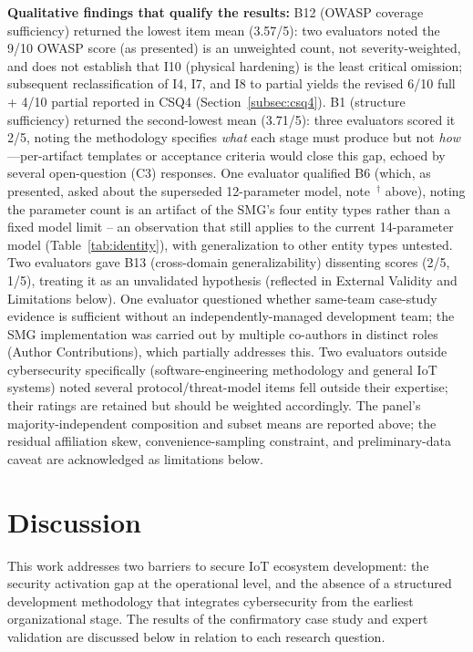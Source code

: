 \documentclass[preprint,12pt,authoryear]{elsarticle}
\begin{document}
\textbf{Qualitative findings that qualify the results:} B12 (OWASP coverage sufficiency) returned the lowest item mean (3.57/5): two evaluators noted the 9/10 OWASP score (as presented) is an unweighted count, not severity-weighted, and does not establish that I10 (physical hardening) is the least critical omission; subsequent reclassification of I4, I7, and I8 to partial yields the revised 6/10 full + 4/10 partial reported in CSQ4 (Section~\ref{subsec:csq4}). B1 (structure sufficiency) returned the second-lowest mean (3.71/5): three evaluators scored it 2/5, noting the methodology specifies \emph{what} each stage must produce but not \emph{how}---per-artifact templates or acceptance criteria would close this gap, echoed by several open-question (C3) responses. One evaluator qualified B6 (which, as presented, asked about the superseded 12-parameter model, note~$^\dagger$ above), noting the parameter count is an artifact of the SMG's four entity types rather than a fixed model limit -- an observation that still applies to the current 14-parameter model (Table~\ref{tab:identity}), with generalization to other entity types untested. Two evaluators gave B13 (cross-domain generalizability) dissenting scores (2/5, 1/5), treating it as an unvalidated hypothesis (reflected in External Validity and Limitations below). One evaluator questioned whether same-team case-study evidence is sufficient without an independently-managed development team; the SMG implementation was carried out by multiple co-authors in distinct roles (Author Contributions), which partially addresses this. Two evaluators outside cybersecurity specifically (software-engineering methodology and general IoT systems) noted several protocol/threat-model items fell outside their expertise; their ratings are retained but should be weighted accordingly. The panel's majority-independent composition and subset means are reported above; the residual affiliation skew, convenience-sampling constraint, and preliminary-data caveat are acknowledged as limitations below.


\section{Discussion}
\label{sec:discussion}

This work addresses two barriers to secure IoT ecosystem development: the security activation gap at the operational level, and the absence of a structured development methodology that integrates cybersecurity from the earliest organizational stage. The results of the confirmatory case study and expert validation are discussed below in relation to each research question.
\end{document}
